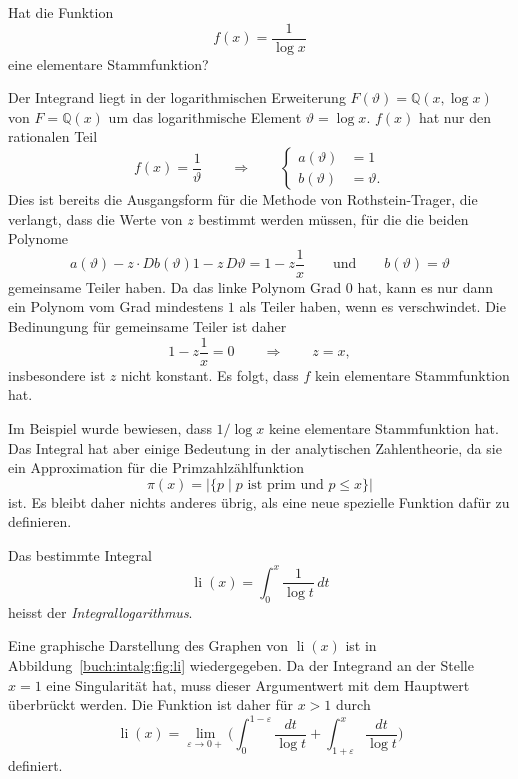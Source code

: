 \begin{beispiel}
\label{buch:intalg:risch:bsp:1/logx}
Hat die Funktion
\[
f(x)
=
\frac{1}{\log x}
\]
eine elementare Stammfunktion?
\medskip

Der Integrand liegt in der logarithmischen Erweiterung
$F(\vartheta) = \mathbb{Q}(x,\log x)$ von $F=\mathbb{Q}(x)$
um das logarithmische Element $\vartheta=\log x$.
$f(x)$ hat nur den rationalen Teil
\[
f(x)
=
\frac{1}{\vartheta}
\qquad
\Rightarrow
\qquad
\begin{cases}
a(\vartheta) &= 1 \\
b(\vartheta) &= \vartheta.
\end{cases}
\]
Dies ist bereits die Ausgangsform für die Methode von Rothstein-Trager,
die verlangt, dass die Werte von $z$ bestimmt werden müssen, für die
die beiden Polynome
\[
a(\vartheta) - z\cdot Db(\vartheta)
1 - z\,D\vartheta
=
1- z\frac{1}{x}
\qquad\text{und}\qquad
b(\vartheta)=\vartheta
\]
gemeinsame Teiler haben.
Da das linke Polynom Grad 0 hat, kann es nur dann ein Polynom vom Grad
mindestens $1$ als Teiler haben, wenn es verschwindet.
Die Bedinungung für gemeinsame Teiler ist daher
\[
1-z\frac{1}{x} = 0 
\qquad\Rightarrow\qquad
z=x,
\]
insbesondere ist $z$ nicht konstant.
Es folgt, dass $f$ kein elementare Stammfunktion hat.
\end{beispiel}

Im Beispiel wurde bewiesen, dass $1/\log x$ keine elementare Stammfunktion
hat.
Das Integral hat aber einige Bedeutung in der analytischen Zahlentheorie,
da sie ein Approximation für die Primzahlzählfunktion 
\[
\pi(x)
=
\bigl|
\{ p \mid \text{$p$ ist prim und $p\le x$} \}
\bigr|
\]
ist.
Es bleibt daher nichts anderes übrig, als eine neue spezielle Funktion
dafür zu definieren.

\begin{definition}[Integrallogarithmus]
\label{buch:intalg:risch:def:integrallogarithmus}
%
Das bestimmte Integral
\[
\operatorname{li}(x)
=
\int_0^x
\frac{1}{\log t}
\,dt
\]
heisst der \emph{Integrallogarithmus}.
%
%
\end{definition}

Eine graphische Darstellung des Graphen von $\operatorname{li}(x)$ ist
in Abbildung~\ref{buch:intalg:fig:li} wiedergegeben.
Da der Integrand an der Stelle $x=1$ eine Singularität hat, muss dieser
Argumentwert mit dem Hauptwert überbrückt werden.
Die Funktion ist daher für $x>1$ durch
\[
\operatorname{li}(x)
=
\lim_{\varepsilon\to 0+}
\biggl(
\int_0^{1-\varepsilon} \frac{dt}{\log t}
+
\int_{1+\varepsilon}^x \frac{dt}{\log t}
\biggr)
\]
definiert.

